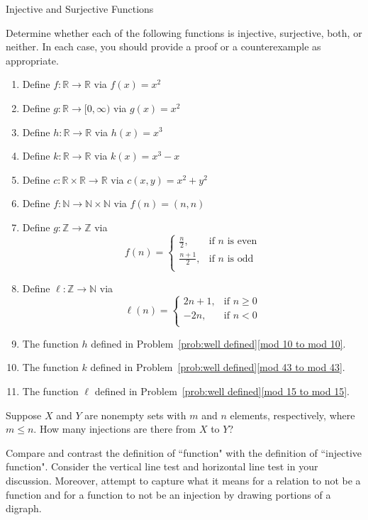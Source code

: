 \begin{section}{Injective and Surjective Functions}
\begin{problem}\label{prob:injective surjective functions}
Determine whether each of the following functions is injective, surjective, both, or neither.  In each case, you should provide a proof or a counterexample as appropriate.
\begin{enumerate}[label=\textrm{(\alph*)}]
\item Define $f:\mathbb{R}\to \mathbb{R}$ via $f(x)=x^{2}$
\item Define $g:\mathbb{R}\to [0,\infty)$ via $g(x)=x^{2}$
\item Define $h:\mathbb{R}\to \mathbb{R}$ via $h(x)=x^{3}$
\item Define $k:\mathbb{R}\to \mathbb{R}$ via $k(x)=x^{3}-x$
\item\label{circles} Define $c: \mathbb{R}\times \mathbb{R}\to \mathbb{R}$ via $c(x,y)=x^{2}+y^{2}$
\item Define $f:\mathbb{N}\to \mathbb{N}\times \mathbb{N}$ via $f(n)=(n,n)$
\item Define $g:\mathbb{Z}\to \mathbb{Z}$ via
\[
f(n)=\begin{cases}
\frac{n}{2}, & \text{if }n\text{ is even}\\
\frac{n+1}{2}, & \text{if }n\text{ is odd}\\
\end{cases}
\]
\item Define $\ell:\mathbb{Z}\to \mathbb{N}$ via
\[
\ell(n)=\begin{cases}
2n+1, & \text{if }n\geq 0\\
-2n, & \text{if }n<0\\
\end{cases}
\]
\item The function $h$ defined in Problem~\ref{prob:well defined}\ref{mod 10 to mod 10}.
\item The function $k$ defined in Problem~\ref{prob:well defined}\ref{mod 43 to mod 43}.
\item The function $\ell$ defined in Problem~\ref{prob:well defined}\ref{mod 15 to mod 15}.
\end{enumerate}
\end{problem}

\begin{problem}
Suppose $X$ and $Y$ are nonempty sets with $m$ and $n$ elements, respectively, where $m\leq  n$. How many injections are there from $X$ to $Y$?
\end{problem}

\begin{problem}
Compare and contrast the definition of ``function" with the definition of ``injective function". Consider the vertical line test and horizontal line test in your discussion.  Moreover, attempt to capture what it means for a relation to not be a function and for a function to not be an injection by drawing portions of a digraph.
\end{problem}


\end{section}
